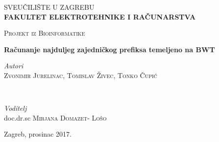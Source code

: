 \documentclass[a4paper,12pt]{article}
\begin{document}

\begin{titlepage}
	\center
	
	\textsc{\Large SVEUČILIŠTE U ZAGREBU}\\
	\vspace{0.4cm}
	\textsc{\Large \textbf{FAKULTET ELEKTROTEHNIKE I RAČUNARSTVA}}
	\vspace{2.5cm}
	\vfill\vfill
    
	\textsc{\Large Projekt iz Bioinformatike}
	\vspace{0.5cm}
	
	{\huge\bfseries Računanje najduljeg zajedničkog prefiksa temeljeno na BWT}
	\vspace{1.2cm}
	
	
	\begin{minipage}{2.5\textwidth}
		\begin{flushleft}
			\large
			\textit{Autori}\\
			\textsc{Zvonimir Jurelinac, Tomislav Živec, Tonko Čupić} %
		\end{flushleft}
	\end{minipage}
	~\vspace{0.3cm}\\
	\begin{minipage}{2.5\textwidth}
		\begin{flushleft}
			\large
			\textit{Voditelj}\\
			doc.dr.sc \textsc{Mirjana Domazet- Lošo} %
		\end{flushleft}
	\end{minipage}
	

	
	\vfill\vfill\vfill\vfill
	
	{\large Zagreb, prosinac 2017.}
	
	
	 
	
	
\end{titlepage}
\end{document}
